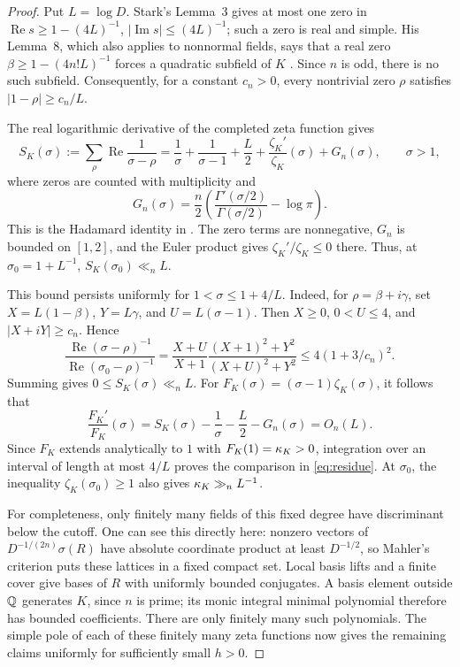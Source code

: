 \begin{proof}
Put $L=\log D$. Stark's Lemma~3 gives at most one zero in
$\operatorname{Re}s\ge1-(4L)^{-1}$,
$|\operatorname{Im}s|\le(4L)^{-1}$; such a zero is real and simple.
His Lemma~8, which also applies to nonnormal fields, says that a real
zero $\beta\ge1-(4n!L)^{-1}$ forces a quadratic subfield of $K$
\cite[Lemmas~3 and~8]{Stark1974}. Since $n$ is odd, there is no such
subfield. Consequently, for a constant $c_n>0$, every nontrivial zero
$\rho$ satisfies $|1-\rho|\ge c_n/L$.

The real logarithmic derivative of the completed zeta function gives
\[
 S_K(\sigma):=\sum_\rho\operatorname{Re}\frac1{\sigma-\rho}
 =\frac1\sigma+\frac1{\sigma-1}+\frac L2
   +\frac{\zeta_K'}{\zeta_K}(\sigma)+G_n(\sigma),\qquad \sigma>1,
\]
where zeros are counted with multiplicity and
\[
 G_n(\sigma)=\frac n2
 \left(\frac{\Gamma'(\sigma/2)}{\Gamma(\sigma/2)}-\log\pi\right).
\]
This is the Hadamard identity in
\cite[Equation~(9)]{Stark1974}. The zero terms are nonnegative,
$G_n$ is bounded on $[1,2]$, and the Euler product gives
$\zeta_K'/\zeta_K\le0$ there. Thus, at $\sigma_0=1+L^{-1}$,
$S_K(\sigma_0)\ll_n L$.

This bound persists uniformly for $1<\sigma\le1+4/L$.
Indeed, for $\rho=\beta+i\gamma$, set
$X=L(1-\beta)$, $Y=L\gamma$, and $U=L(\sigma-1)$.
Then $X\ge0$, $0<U\le4$, and $|X+iY|\ge c_n$. Hence
\[
 \frac{\operatorname{Re}(\sigma-\rho)^{-1}}
      {\operatorname{Re}(\sigma_0-\rho)^{-1}}
 =\frac{X+U}{X+1}
   \frac{(X+1)^2+Y^2}{(X+U)^2+Y^2}
 \le4(1+3/c_n)^2.
\]
Summing gives $0\le S_K(\sigma)\ll_n L$.
For $F_K(\sigma)=(\sigma-1)\zeta_K(\sigma)$, it follows that
\[
 \frac{F_K'}{F_K}(\sigma)
 =S_K(\sigma)-\frac1\sigma-\frac L2-G_n(\sigma)
 =O_n(L).
\]
Since $F_K$ extends analytically to $1$ with $F_K(1)=\kappa_K>0$,
integration over an interval of length at most $4/L$ proves the
comparison in \eqref{eq:residue}. At $\sigma_0$, the inequality
$\zeta_K(\sigma_0)\ge1$ also gives $\kappa_K\gg_n L^{-1}$.

For completeness, only finitely many fields of this fixed degree
have discriminant below the cutoff. One can see this directly here:
nonzero vectors of $D^{-1/(2n)}\sigma(R)$ have absolute coordinate
product at least $D^{-1/2}$, so Mahler's criterion puts these lattices
in a fixed compact set. Local basis lifts and a finite cover give
bases of $R$ with uniformly bounded conjugates. A basis element
outside $\mathbb Q$ generates $K$, since $n$ is prime; its monic integral
minimal polynomial therefore has bounded coefficients. There are
only finitely many such polynomials. The simple pole of each of
these finitely many zeta functions now gives the remaining claims
uniformly for sufficiently small $h>0$.
\end{proof}

